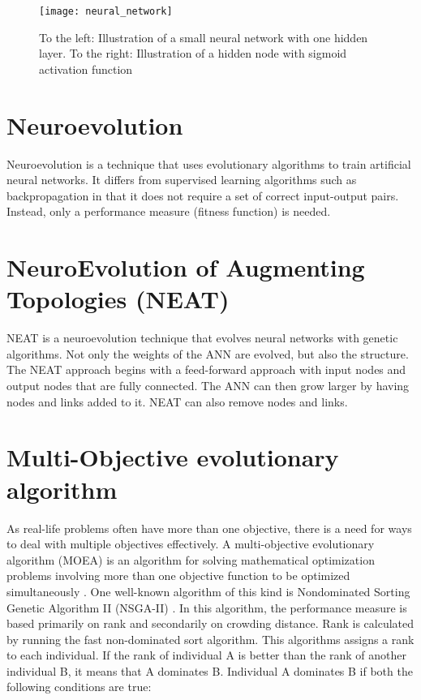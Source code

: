 \begin{figure}[H]
    \centering
    \texttt{[image: neural\_network]}
    \caption{To the left: Illustration of a small neural network with one hidden layer. To the right: Illustration of a hidden node with sigmoid activation function}
    \label{fig:neural_network}
\end{figure}

\section{Neuroevolution}
Neuroevolution is a technique that uses evolutionary algorithms to train artificial neural networks. It differs from supervised learning algorithms such as backpropagation in that it does not require a set of correct input-output pairs. Instead, only a performance measure (fitness function) is needed.

\section{NeuroEvolution of Augmenting Topologies (NEAT)}
NEAT \citep{stanley2002} is a neuroevolution technique that evolves neural networks with genetic algorithms. Not only the weights of the ANN are evolved, but also the structure. The NEAT approach begins with a feed-forward approach with input nodes and output nodes that are fully connected. The ANN can then grow larger by having nodes and links added to it. NEAT can also remove nodes and links.

\iffalse
TODO:
Competing conventions
Species
Genotype (list of nodes, list of connections)
Phenotype
Crossover
Interspecies crossover
Dynamic compatibility
Min species
Max species
Aging species
Innovations
Young age fitness boost
Species stagnation
Competitive coevolution stagnation
Kill worst species each 15 generations
Survival rate
Elitism
Tournament selection
Sexual vs asexual reproduction?
Mutation operations
\fi

\section{Multi-Objective evolutionary algorithm}
As real-life problems often have more than one objective, there is a need for ways to deal with multiple objectives effectively. A multi-objective evolutionary algorithm (MOEA) is an algorithm for solving mathematical optimization problems involving more than one objective function to be optimized simultaneously \citep{veldhuizen2000}. One well-known algorithm of this kind is Nondominated Sorting Genetic Algorithm II (NSGA-II) \citep{nsga2}. In this algorithm, the performance measure is based primarily on rank and secondarily on crowding distance. Rank is calculated by running the fast non-dominated sort algorithm. This algorithms assigns a rank to each individual. If the rank of individual A is better than the rank of another individual B, it means that A dominates B. Individual A dominates B if both the following conditions are true:

